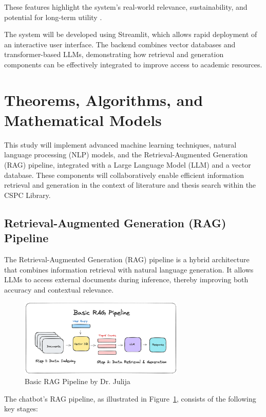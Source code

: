 \begin{refsection}
These features highlight the system's real-world relevance, sustainability, and potential for long-term utility \cite{hevner2004design}.

The system will be developed using Streamlit, which allows rapid deployment of an interactive user interface. The backend combines vector databases and transformer-based LLMs, demonstrating how retrieval and generation components can be effectively integrated to improve access to academic resources.

\section{Theorems, Algorithms, and Mathematical Models}

This study will implement advanced machine learning techniques, natural language processing (NLP) models, and the Retrieval-Augmented Generation (RAG) pipeline, integrated with a Large Language Model (LLM) and a vector database. These components will collaboratively enable efficient information retrieval and generation in the context of literature and thesis search within the CSPC Library.

\newpage
\clearpage
\subsection{Retrieval-Augmented Generation (RAG) Pipeline}

The Retrieval-Augmented Generation (RAG) pipeline is a hybrid architecture that combines information retrieval with natural language generation. It allows LLMs to access external documents during inference, thereby improving both accuracy and contextual relevance.

\begin{figure}[htbp]
    \centering
    \includegraphics[width=0.7\textwidth]{figures/rag.png}
    \caption{Basic RAG Pipeline by Dr. Julija}
    \label{fig:rag}
\end{figure}

The chatbot’s RAG pipeline, as illustrated in Figure~\ref{fig:rag}, consists of the following key stages:


\end{refsection}
